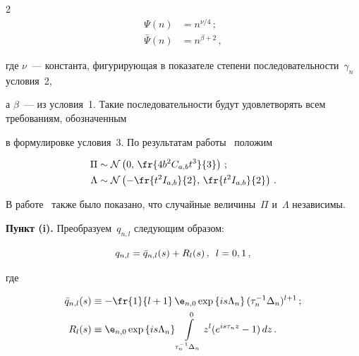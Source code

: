 \begin{multicols}{2}
\begin{align}
\Psi(n) &= n^{\nu/4}\,; \label{l26}\\


\bar{\Psi}(n) &= n^{\beta+2}\,, \label{l27}


\end{align}


где $\nu$~--- константа, фигурирующая в показателе степени последовательности~$\gamma_n$ условия~2, 


а $\beta$~--- из условия~1. Такие последовательности будут удовлетворять всем требованиям, обозначенным 


в формулировке условия~3. По результатам работы~\cite{article} положим


\begin{align*}


\Pi &\sim \n \left(0,\, \fr{4b^2 \cab t^3}{3}\right)\,;\\


\Lambda &\sim \n \left(-\fr{t^2\iab}{2},\, \fr{t^2\iab}{2}\right)\,.


\end{align*}


В работе~\cite{article} также было показано, что случайные величины~$\Pi$ и~$\Lambda$ независимы.





\medskip





\noindent


\textbf{Пункт (i).} Преобразуем~$q_{n,l}$ следующим образом:


$$


q_{n,l} = \bar{q}_{n,l}(s) + R_l(s)\,, \enskip l = 0, 1\,,


$$


где





\noindent


\begin{align*}


\bar{q}_{n,l}(s) &\equiv -\fr{1}{l+1}\,{\e}_{n,0}\exp\left\{is\Lambda_n\right\}(\tau_n^{-1} \Delta_n)^{l+1}\,;


\\


R_l(s) &\equiv {\e}_{n,0}\exp\left\{is\Lambda_n\right\}\int\limits_{\tau_n^{-1} \Delta_n}^0z^l(e^{is\tau_n z}-1)\,dz\,.


\end{align*}



\end{multicols}
